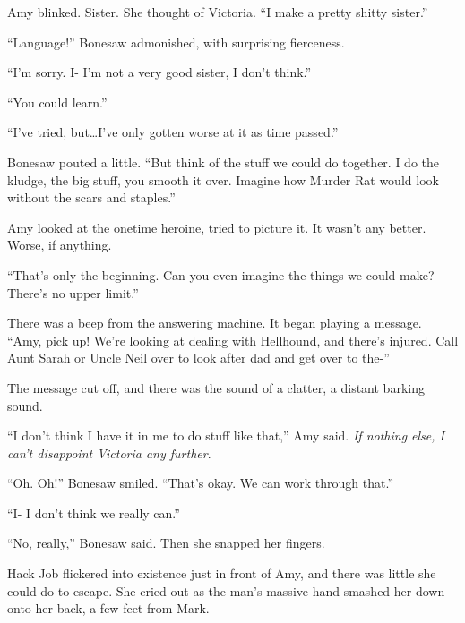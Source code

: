Amy blinked.  Sister.  She thought of Victoria.  ``I make a pretty shitty sister.''



``Language!''  Bonesaw admonished, with surprising fierceness.



``I'm sorry.  I- I'm not a very good sister, I don't think.''



``You could learn.''



``I've tried, but\ldots I've only gotten worse at it as time passed.''



Bonesaw pouted a little.  ``But think of the stuff we could do together.  I do the kludge, the big stuff, you smooth it over.  Imagine how Murder Rat would look without the scars and staples.''



Amy looked at the onetime heroine, tried to picture it.  It wasn't any better.  Worse, if anything.



``That's only the beginning.  Can you even imagine the things we could make?  There's no upper limit.''



There was a beep from the answering machine.  It began playing a message.  ``Amy, pick up!  We're looking at dealing with Hellhound, and there's injured.  Call Aunt Sarah or Uncle Neil over to look after dad and get over to the-''



The message cut off, and there was the sound of a clatter, a distant barking sound.



``I don't think I have it in me to do stuff like that,'' Amy said.  \emph{If nothing else, I can't disappoint Victoria any further}.



``Oh.  Oh!''  Bonesaw smiled.  ``That's okay.  We can work through that.''



``I- I don't think we really can.''



``No, really,'' Bonesaw said.  Then she snapped her fingers.



Hack Job flickered into existence just in front of Amy, and there was little she could do to escape.  She cried out as the man's massive hand smashed her down onto her back, a few feet from Mark.



